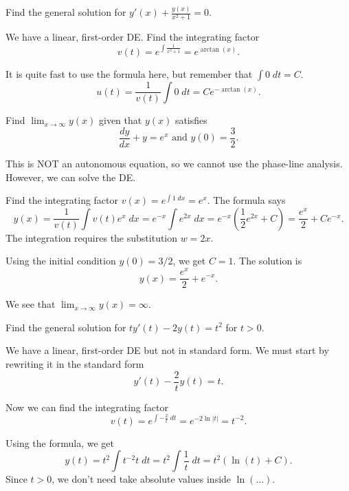 \documentclass[../main.tex]{subfiles}
\begin{document}
\begin{exercise}
  Find the general solution for \(y'(x) + \frac{y(x)}{x^{2} + 1} = 0\).

  \begin{solution}
    We have a linear, first-order DE. Find the integrating factor
    \[
      v(t) = e^{\int \frac{1}{x^{2} + 1}} = e^{\arctan(x)}.
    \]
    
    It is quite fast to use the formula here, but remember that \(\int 0 \;dt = C\).
    \[
      u(t) = \frac{1}{v(t)} \int 0 \;dt = Ce^{-\arctan(x)}.
    \]
  \end{solution}
\end{exercise}

\begin{exercise}
  Find \(\lim_{x \to \infty} y(x)\) given that \(y(x)\) satisfies
  \[
    \frac{dy}{dx} + y = e^{x} \text{ and \(y(0) = \frac{3}{2}\)}.
  \]

  \begin{solution}
    This is NOT an autonomous equation, so we cannot use the phase-line analysis. However, we can solve the DE.

    Find the integrating factor \(v(x) = e^{\int 1 \;dx} = e^{x}\). The formula says 
    \[
      y(x) = \frac{1}{v(t)} \int v(t) e^{x}\;dx = e^{-x} \int e^{2x} \;dx = e^{-x}\left( \frac{1}{2} e^{2x} + C \right) = \frac{e^{x}}{2} + C e^{-x}.
    \]
    The integration requires the substitution \(w = 2x\).

    Using the initial condition \(y(0) = 3/2\), we get \(C = 1\). The solution is
    \[
      y(x) = \frac{e^{x}}{2} + e^{-x}.
    \]

  
    We see that \(\lim_{x \to \infty} y(x) = \infty\).
  \end{solution}
\end{exercise}

\begin{exercise}
  Find the general solution for \(t y'(t) - 2y(t) = t^{2}\) for \(t > 0\).

  \begin{solution}
    We have a linear, first-order DE but not in standard form.  We must start by rewriting it in the standard form 
    \[
      y'(t) - \frac{2}{t} y(t) = t.
    \]

    Now we can find the integrating factor
    \[
      v(t) = e^{\int -\frac{2}{t} \;dt} = e^{-2\ln|t|} = t^{-2}.
    \]

    Using the formula, we get
    \[
      y(t) = t^{2} \int t^{-2} t \;dt = t^{2} \int \frac{1}{t} \;dt = t^{2}\left( \ln(t) + C \right).
    \]
    Since \(t > 0\), we don't need take absolute values inside \(\ln(\ldots)\).
  \end{solution}
\end{exercise}
\end{document}
